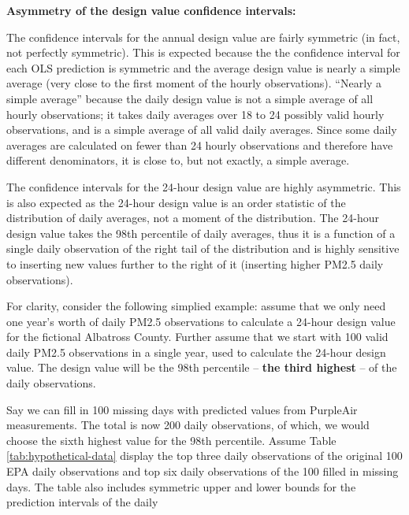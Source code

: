 \documentclass[12pt]{article}
\begin{document}
\newpage\noindent
\textbf{Asymmetry of the design value confidence intervals:}

The confidence intervals for the annual design value are fairly symmetric (in fact, not perfectly symmetric). This is expected because the the confidence interval for each OLS prediction is symmetric and the average design value is nearly a simple average (very close to the first moment of the hourly observations). ``Nearly a simple average'' because the daily design value is not a simple average of all hourly observations; it takes daily averages over 18 to 24 possibly valid hourly observations, and is a simple average of all valid daily averages. Since some daily averages are calculated on fewer than 24 hourly observations and therefore have different denominators, it is close to, but not exactly, a simple average.

The confidence intervals for the 24-hour design value are highly asymmetric. This is also expected as the 24-hour design value is an order statistic of the distribution of daily averages, not a moment of the distribution. The 24-hour design value takes the 98th percentile of daily averages, thus it is a function of a single daily observation of the right tail of the distribution and is highly sensitive to inserting new values further to the right of it (inserting higher PM2.5 daily observations).

For clarity, consider the following simplied example: assume that we only need one year's worth of daily PM2.5 observations to calculate a 24-hour design value for the fictional Albatross County. Further assume that we start with 100 valid daily PM2.5 observations in a single year, used to calculate the 24-hour design value. The design value will be the 98th percentile -- \textbf{the third highest} -- of the daily observations. 

Say we can fill in 100 missing days with predicted values from PurpleAir measurements. The total is now 200 daily observations, of which, we would choose the sixth highest value for the 98th percentile. Assume Table \ref{tab:hypothetical-data} display the top three daily observations of the original 100 EPA daily observations and top six daily observations of the 100 filled in missing days. The table also includes symmetric upper and lower bounds for the prediction intervals of the daily 
\end{document}
